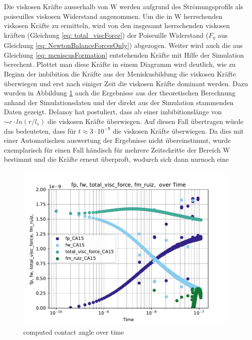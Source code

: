 Die viskosen Kräfte ausserhalb von $\mathrm{W}$ werden aufgrund des Strömungsprofils als poiseuilles viskosen Widerstand angenommen. Um die in $\mathrm{W}$ herrschenden viskosen Kräfte zu ermitteln, wird von den insgesamt herrschenden viskosen kräften (Gleichung \ref*{eq: total_viscForce}) der Poiseuille Widerstand ($F_{\eta}$ aus Gleichung \ref*{eq: NewtonBalanceForcesOnly}) abgezogen. 
Weiter wird auch die aus Gleichung \ref*{eq: meniscusFormation} entstehenden Kräfte mit Hilfe der Simulation berechent. Plottet man diese Kräfte in einem Diagramm wird deutlich, wie zu Beginn der imbibition die Kräfte aus der Meniskusbildung die viskosen Kräfte überwiegen und erst nach einiger Zeit die viskosen Kräfte dominant werden. Dazu wurden in Abbildung \ref*{fig: forcesOverTime} auch die Ergebnisse aus der theoretischen Berechnung anhand der Simulationsdaten und der direkt aus der Simulation stammenden Daten gezeigt. Delanoy hat postuliert, dass ab einer imbibitionslänge von $\sim r\cdot ln(r/l_s)$ die viskosen Kräfte überwiegen. Auf diesen Fall übertragen würde das bedeuteten, dass für $t\approx 3\cdot 10^{-9}$ die viskosen Kräfte überwiegen. Da dies mit einer Automatischen auswertung der Ergebnisse nicht übereinstimmt, wurde exemplarisch für einen Fall händisch für mehrere Zeitschritte der Bereich $\mathrm{W}$ bestimmt und die Kräfte erneut überproft, wodurch sich dann nurnoch eine 


\begin{figure}[h]
    \centering
    \includegraphics[width=.95\textwidth]{Pictures/log_fp_fw_total_visc_force_fm_ruiz_overTime.pdf}
    \caption{computed contact angle over time }
    \label{fig: forcesOverTime}
\end{figure}




